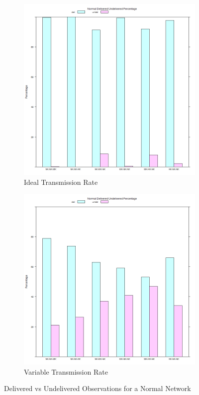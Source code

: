 \begin{figure}[H]
\centering
\begin{subfigure}{.5\textwidth}
  \centering
\includegraphics[width=\linewidth]{Chap7/figures/plots/normal_ideal/delvsundel_percent.png}
  \caption{Ideal Transmission Rate}
\label{fig:sim:res:norm:ideal:delundel}
\end{subfigure}%
\begin{subfigure}{.5\textwidth}
  \centering
	\includegraphics[width=\linewidth]{Chap7/figures/plots/normal_variable/delvsundel_percent.png}
  \caption{Variable Transmission Rate}
	\label{fig:sim:res:norm:variable:delundel}
\end{subfigure}
\caption{Delivered vs Undelivered Observations for a Normal Network}
\end{figure}


